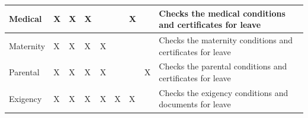 \documentclass{article}
\begin{document}
\begin{footnotesize}
\begin{center}
\begin{tabular}{|l||l|l|l|l|l|l|l|p{6cm}|}
Medical				&X&X&X&&&X&& Checks the medical conditions and certificates for leave \\ \hline
Maternity			&X&X&X&X&&&& Checks the maternity conditions and certificates for leave \\ \hline
Parental			&X&X&X&X&&&X& Checks the parental conditions and certificates for leave \\ \hline
Exigency			&X&X&X&X&X&X&& Checks the exigency conditions and documents for leave \\ \hline
\end{tabular}
\end{center}
\end{footnotesize}
\end{document}

